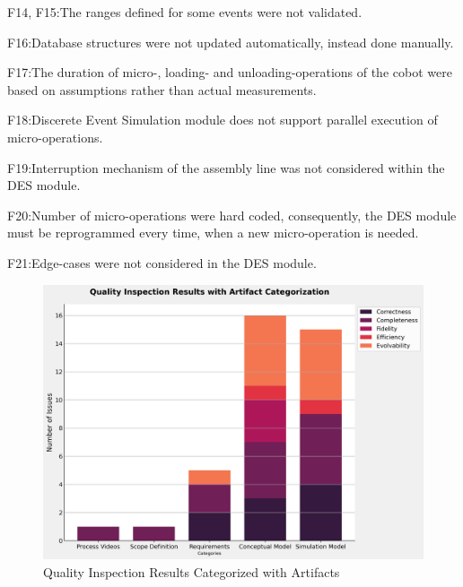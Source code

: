 \documentclass{llncs}
\begin{document}
F14, F15:The ranges defined for some events were not validated. 

F16:Database structures were not updated automatically, instead done manually.

F17:The duration of micro-, loading- and unloading-operations of the cobot were based on assumptions rather than actual measurements.

F18:Discerete Event Simulation module does not support parallel execution of micro-operations. 

F19:Interruption mechanism of the assembly line was not considered within the DES module. 

F20:Number of micro-operations were hard coded, consequently, the DES module must be reprogrammed every time, when a new micro-operation is needed. 

F21:Edge-cases were not considered in the DES module.  

    \begin{figure}[htbp]
        \includegraphics[scale = 0.40]{quality_inspection_results_with_artifacts.png}
        \caption{ Quality Inspection Results Categorized with Artifacts}
        \label{fig:QualityInspectonResultsWithArtifacts}
    \end{figure}
\end{document}
